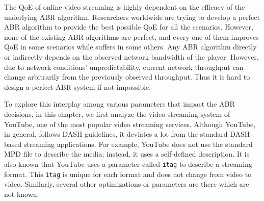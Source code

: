 
The \ac{QoE} of online video streaming is highly dependent on the efficacy of the underlying \ac{ABR} algorithm. Researchers worldwide are trying to develop a perfect \ac{ABR} algorithm to provide the best possible \ac{QoE} for all the scenarios. However, none of the existing \ac{ABR} algorithms are perfect, and every one of them improves \ac{QoE} in some scenarios while suffers in some others. Any \ac{ABR} algorithm directly or indirectly depends on the observed network bandwidth of the player. However, due to network conditions' unpredictability, current network throughput can change arbitrarily from the previously observed throughput. Thus it is hard to design a perfect \ac{ABR} system if not impossible. 

To explore this interplay among various parameters that impact the \ac{ABR} decisions, in this chapter, we first analyze the video streaming system of YouTube, one of the most popular video streaming services. Although YouTube, in general, follows \ac{DASH} guidelines, it deviates a lot from the standard DASH-based streaming applications. For example, YouTube does not use the standard \ac{MPD} file to describe the media; instead, it uses a self-defined description. It is also known that YouTube uses a parameter called {\tt itag} to describe a streaming format. This {\tt itag} is unique for each format and does not change from video to video. Similarly, several other optimizations or parameters are there which are not known. 

